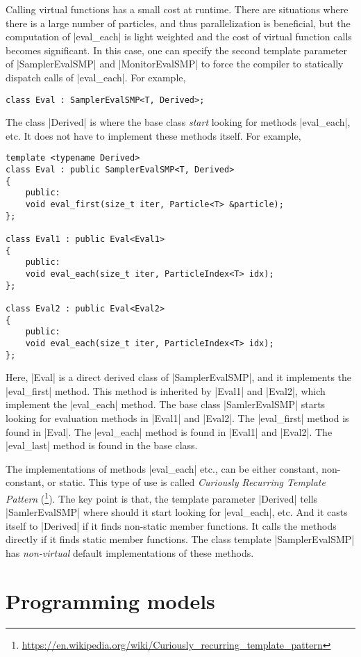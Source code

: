 Calling virtual functions has a small cost at runtime. There are situations
where there is a large number of particles, and thus parallelization is
beneficial, but the computation of |eval_each| is light weighted and the cost
of virtual function calls becomes significant. In this case, one can specify
the second template parameter of |SamplerEvalSMP| and |MonitorEvalSMP| to force
the compiler to statically dispatch calls of |eval_each|. For example,
\begin{verbatim}
class Eval : SamplerEvalSMP<T, Derived>;
\end{verbatim}
The class |Derived| is where the base class \emph{start} looking for methods
|eval_each|, etc. It does not have to implement these methods itself. For
example,
\begin{verbatim}
template <typename Derived>
class Eval : public SamplerEvalSMP<T, Derived>
{
    public:
    void eval_first(size_t iter, Particle<T> &particle);
};

class Eval1 : public Eval<Eval1>
{
    public:
    void eval_each(size_t iter, ParticleIndex<T> idx);
};

class Eval2 : public Eval<Eval2>
{
    public:
    void eval_each(size_t iter, ParticleIndex<T> idx);
};
\end{verbatim}
Here, |Eval| is a direct derived class of |SamplerEvalSMP|, and it implements
the |eval_first| method. This method is inherited by |Eval1| and |Eval2|, which
implement the |eval_each| method. The base class |SamlerEvalSMP| starts looking
for evaluation methods in |Eval1| and |Eval2|. The |eval_first| method is found
in |Eval|. The |eval_each| method is found in |Eval1| and |Eval2|. The
|eval_last| method is found in the base class.

The implementations of methods |eval_each| etc., can be either constant,
non-constant, or static. This type of use is called \emph{Curiously Recurring
  Template Pattern} (\crtp\footnote{
\url{https://en.wikipedia.org/wiki/Curiously_recurring_template_pattern}}). The
key point is that, the template parameter |Derived| tells |SamlerEvalSMP| where
should it start looking for |eval_each|, etc. And it casts itself to |Derived|
if it finds non-static member functions. It calls the methods directly if it
finds static member functions. The class template |SamplerEvalSMP| has
\emph{non-virtual} default implementations of these methods.

\section{Programming models}
\label{sec:Programming models}

